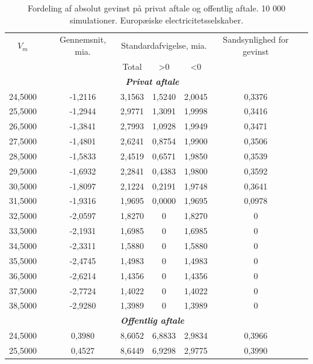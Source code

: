 \documentclass{article}
\begin{document}
\begin{table}[h]
	\caption{Fordeling af absolut gevinst p\aa{} privat aftale og offentlig aftale. 10 000 simulationer. Europæiske electricitetsselskaber.}
	\label{tab:abs_fordeling}
\begin{center}
	\begin{tabular}{cXcccccr}
	\toprule[1pt] 
	$V_m$ && Gennemsnit, mia. & \multicolumn{3}{c}{Standardafvigelse, mia.}  & Sandsynlighed for gevinst\\
	& & &Total & >0 & <0 \\
	\hline 
	\multicolumn{7}{c}{\emph{\textbf{Privat aftale}}} \\
24{,}5000&&-1{,}2116& 3{,}1563& 1{,}5240& 2{,}0045& 0{,}3376\\
25{,}5000&&-1{,}2944& 2{,}9771& 1{,}3091& 1{,}9998& 0{,}3416\\
26{,}5000&&-1{,}3841& 2{,}7993& 1{,}0928& 1{,}9949& 0{,}3471\\
27{,}5000&&-1{,}4801& 2{,}6241& 0{,}8754& 1{,}9900& 0{,}3506\\
28{,}5000&&-1{,}5833& 2{,}4519& 0{,}6571& 1{,}9850& 0{,}3539\\
29{,}5000&&-1{,}6932& 2{,}2841& 0{,}4383& 1{,}9800& 0{,}3592\\
30{,}5000&&-1{,}8097& 2{,}1224& 0{,}2191& 1{,}9748& 0{,}3641\\
31{,}5000&&-1{,}9316& 1{,}9695& 0{,}0000& 1{,}9695& 0{,}0978\\
32{,}5000&&-2{,}0597& 1{,}8270&0& 1{,}8270&0\\
33{,}5000&&-2{,}1931& 1{,}6985&0& 1{,}6985&0\\
34{,}5000&&-2{,}3311& 1{,}5880&0& 1{,}5880&0\\
35{,}5000&&-2{,}4745& 1{,}4983&0& 1{,}4983&0\\
36{,}5000&&-2{,}6214& 1{,}4356&0& 1{,}4356&0\\
37{,}5000&&-2{,}7724& 1{,}4022&0& 1{,}4022&0\\
38{,}5000&&-2{,}9280& 1{,}3989&0& 1{,}3989&0\\
\multicolumn{7}{c}{\emph{\textbf{Offentlig aftale}}} \\
 24{,}5000&&0{,}3980&8{,}6052&6{,}8833&2{,}9834&0{,}3966 \\
 25{,}5000&&0{,}4527&8{,}6449&6{,}9298&2{,}9775&0{,}3990\\

\end{tabular}
\end{center}
\end{table}
\end{document}
